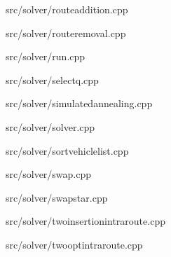 \begin{DoxyCompactItemize}
src/solver/routeaddition.\+cpp\item 
src/solver/routeremoval.\+cpp\item 
src/solver/run.\+cpp\item 
src/solver/selectq.\+cpp\item 
src/solver/simulatedannealing.\+cpp\item 
src/solver/solver.\+cpp\item 
src/solver/sortvehiclelist.\+cpp\item 
src/solver/swap.\+cpp\item 
src/solver/swapstar.\+cpp\item 
src/solver/twoinsertionintraroute.\+cpp\item 
src/solver/twooptintraroute.\+cpp\end{DoxyCompactItemize}
